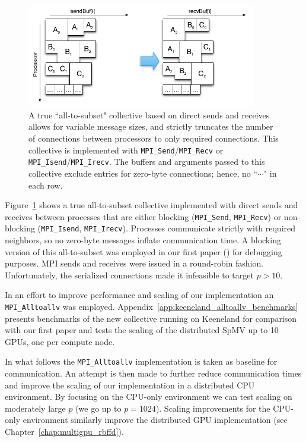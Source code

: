 \documentclass{report}
\begin{document}
\begin{figure}
\centering
\includegraphics[width=10cm]{../figures/omnigraffle/MPI_IsendIrecv_Visual.png}
\caption{A true ``all-to-subset" collective based on direct sends and receives allows for variable message sizes, and strictly truncates the number of connections between processors to only required connections. This collective is implemented with \texttt{MPI\_Send}/\texttt{MPI\_Recv} or \texttt{MPI\_Isend}/\texttt{MPI\_Irecv}. The buffers and arguments passed to this collective exclude entries for zero-byte connections; hence, no ``$\cdots$" in each row. }
\label{fig:mpi_isendirecv_visual}
\end{figure}

Figure~\ref{fig:mpi_isendirecv_visual} shows a true all-to-subset collective implemented with direct sends and receives between processes that are either blocking (\texttt{MPI\_Send}, \texttt{MPI\_Recv}) or non-blocking (\texttt{MPI\_Isend}, \texttt{MPI\_Irecv}). Processes communicate strictly with required neighbors, so no zero-byte messages inflate communication time. 
A blocking version of this all-to-subset was employed in our first paper (\cite{BolligFlyerErlebacher2012}) for debugging purposes. MPI sends and receives were issued in a round-robin fashion. Unfortunately, the serialized connections made it infeasible to target $p > 10$. 

In an effort to improve performance and scaling of our implementation an \texttt{MPI\_Alltoallv} was employed. Appendix~\ref{app:keeneland_alltoallv_benchmarks} presents benchmarks of the new collective running on Keeneland for comparison with our first paper and tests the scaling of the distributed SpMV up to 10 GPUs, one per compute node. 

In what follows the \texttt{MPI\_Alltoallv} implementation is taken as baseline for communication. An attempt is then made to further reduce communication times and improve the scaling of our implementation in a distributed CPU environment. By focusing on the CPU-only environment we can test scaling on moderately large $p$ (we go up to $p = 1024$). Scaling improvements for the CPU-only environment similarly improve the distributed GPU implementation (see Chapter~\ref{chap:multigpu_rbffd}). 
\end{document}
